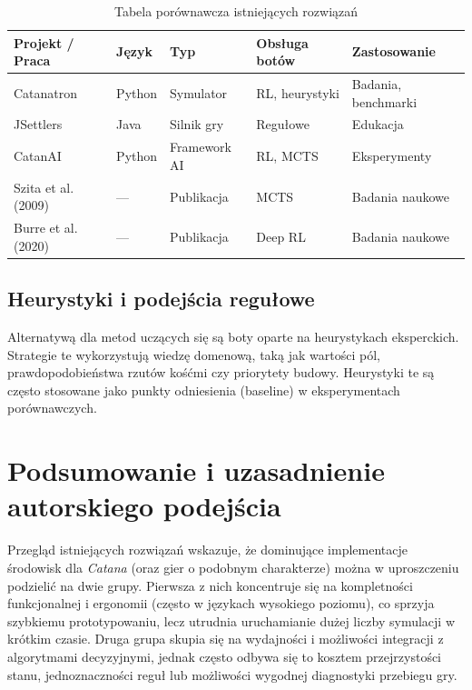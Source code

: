 \documentclass[polish,inz,longabstract]{iithesis}
\begin{document}
\begin{table}[h]
\centering
\caption{Tabela porównawcza istniejących rozwiązań}
\medskip
\begin{tabular}{|l|l|l|l|l|}
\hline
\textbf{Projekt / Praca} & \textbf{Język} & \textbf{Typ} & \textbf{Obsługa botów} & \textbf{Zastosowanie} \\
\hline
Catanatron & Python & Symulator & RL, heurystyki & Badania, benchmarki \\
\hline
JSettlers & Java & Silnik gry & Regułowe & Edukacja \\
\hline
CatanAI & Python & Framework AI & RL, MCTS & Eksperymenty \\
\hline
Szita et al. (2009) & — & Publikacja & MCTS & Badania naukowe \\
\hline
Burre et al. (2020) & — & Publikacja & Deep RL & Badania naukowe \\
\hline
\end{tabular}
\end{table}

\bigskip
\bigskip
\bigskip

\subsection{Heurystyki i podejścia regułowe}

Alternatywą dla metod uczących się są boty oparte na heurystykach eksperckich. Strategie te wykorzystują wiedzę domenową, taką jak wartości pól, prawdopodobieństwa rzutów kośćmi czy priorytety budowy. Heurystyki te są często stosowane jako punkty odniesienia (baseline) w eksperymentach porównawczych.

\section{Podsumowanie i uzasadnienie autorskiego podejścia}

Przegląd istniejących rozwiązań wskazuje, że dominujące implementacje środowisk dla \textit{Catana} (oraz gier o podobnym charakterze) można w uproszczeniu podzielić na dwie grupy. Pierwsza z nich koncentruje się na kompletności funkcjonalnej i ergonomii (często w językach wysokiego poziomu), co sprzyja szybkiemu prototypowaniu, lecz utrudnia uruchamianie dużej liczby symulacji w krótkim czasie. Druga grupa skupia się na wydajności i możliwości integracji z algorytmami decyzyjnymi, jednak często odbywa się to kosztem przejrzystości stanu, jednoznaczności reguł lub możliwości wygodnej diagnostyki przebiegu gry.
\end{document}
